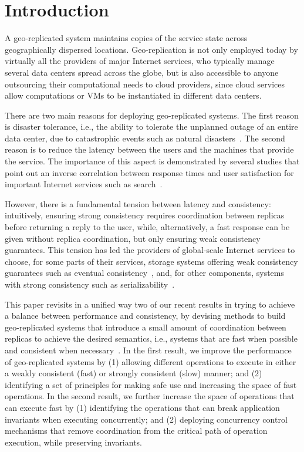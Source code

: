 \documentclass[11pt]{article}
\begin{document}
\section{Introduction}

A geo-replicated system maintains copies of the service state across geographically dispersed locations.
Geo-replication is not only employed today by virtually all the providers of major Internet services, who typically manage several data centers spread across the globe, but is also accessible to anyone outsourcing their computational needs to cloud providers, since cloud services allow computations or VMs to be instantiated in different data centers.

There are two main reasons for deploying geo-replicated systems. The first reason is disaster tolerance, i.e., the ability to tolerate the unplanned outage of an entire data center, due to catastrophic events such as natural disasters~\cite{dc-outages}. The second reason is to reduce the latency between the users and the machines that provide the service. The importance of this aspect is demonstrated by several studies that point out an inverse correlation between response times and user satisfaction for important Internet services such as search~\cite{Schurman2009latency}.


However, there is a fundamental tension between latency and consistency: intuitively, ensuring strong consistency requires coordination between replicas before returning a reply to the user, while, alternatively, a fast response can be given without replica coordination, but only ensuring weak consistency guarantees. This tension has led the providers of global-scale Internet services to choose, for some parts of their services, storage systems offering weak consistency guarantees such as eventual consistency~\cite{dynamo}, and, for other components, systems with strong consistency such as serializability~\cite{Bernstein1987CCR}.

This paper revisits in a unified way two of our recent results in trying to achieve a balance between performance and consistency, by devising methods to build geo-replicated systems that introduce a small amount of coordination between replicas to achieve the desired semantics, i.e., systems that are fast when possible and consistent when necessary~\cite{Li2012RedBlue, Balegas2015Indigo}.
In the first result, we improve the performance of geo-replicated systems by (1) allowing different operations to execute in either a weakly consistent (fast) or strongly consistent (slow) manner; and (2) identifying a set of principles for making safe use
and increasing the space of fast operations.
In the second result, we further increase the space of operations that can execute fast by (1) identifying the operations that can break application invariants when executing concurrently; and (2) deploying concurrency control mechanisms that remove coordination from the critical path of operation execution, while preserving invariants.
\end{document}
